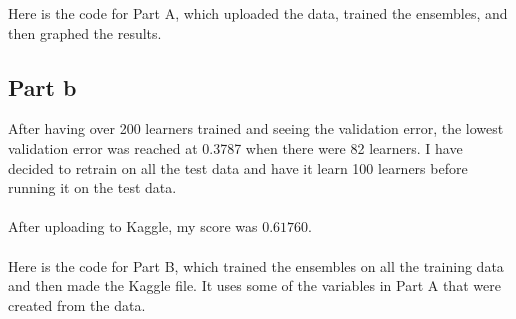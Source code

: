 \documentclass[twoside,11pt]{article}
\theoremstyle{definition}
\begin{document}
\newpage

Here is the code for Part A, which uploaded the data, trained the ensembles, and then graphed the results.


\newpage

\subsection*{Part b}

After having over 200 learners trained and seeing the validation error, the lowest validation error was reached at 0.3787 when there were 82 learners. I have decided to retrain on all the test data and have it learn 100 learners before running it on the test data. \\
\\
After uploading to Kaggle, my score was $0.61760$.\\
\\
Here is the code for Part B, which trained the ensembles on all the training data and then made the Kaggle file. It uses some of the variables in Part A that were created from the data. \\

\end{document}

